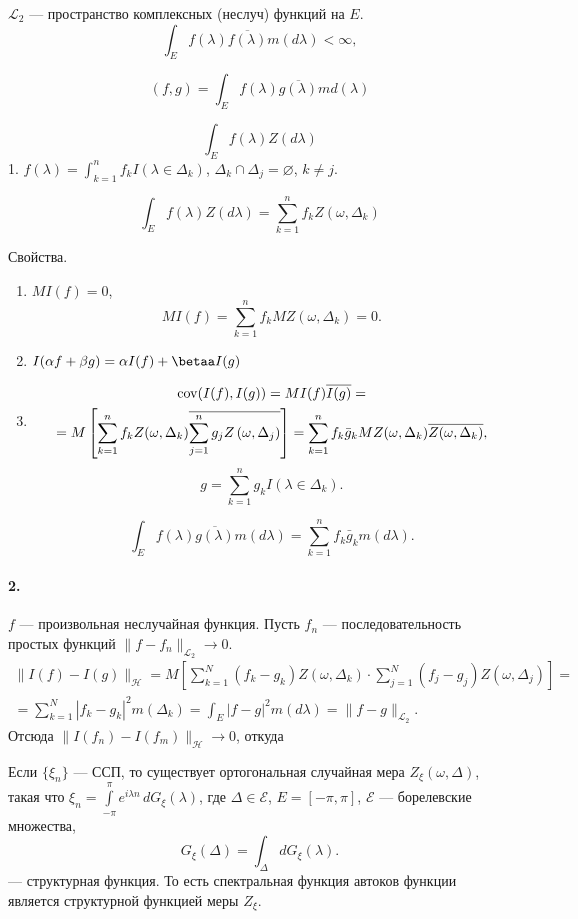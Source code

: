 $\mathscr{L}_2$ --- пространство комплексных (неслуч) функций на $ E $. 
\[
  \int_E f(\lambda)\overline{f(\lambda)} m(d\lambda) < \infty,
\]
 
\[
  (f, g) = \int_E f(\lambda)\overline{g(\lambda)}md(\lambda)
\]
 
\[
    \int_E f(\lambda)Z(d\lambda)
\]
1. $ f(\lambda) = \int_{k=1}^n f_k I(\lambda \in \Delta_k) $,
$ \Delta_k \cap \Delta_j = \varnothing $, $ k\neq j $.
 
\[
  \int_E f(\lambda)Z(d\lambda) = \sum_{k=1}^n f_k Z(\omega,\Delta_k)
\]

Свойства.
\begin{enumerate}
  \item $ MI(f) = 0 $,  
  \[
    MI(f) = \sum_{k=1}^n f_k MZ(\omega, \Delta_k) = 0.
  \]
\item $ I(\alpha f +\beta g) = \alpha I(f) + \betaa I(g) $
\item
  \begin{multline*}
    \operatorname{cov}(I(f), I(g)) = MI(f) \overline{I(g)} = \\ =
    M \left[ \sum_{k=1}^n f_k
      Z(\omega, \Delta_k) \overline{\sum_{j=1}^n g_j Z\left(\omega,\Delta_j\right)}
    \right] = \sum_{k=1}^n f_k \bar{g}_k MZ(\omega, \Delta_k)
    \overline{Z(\omega,\Delta_k)},
  \end{multline*}
\[
  g = \sum_{k=1}^n g_k I(\lambda \in \Delta_k).
\]
 
\[
  \int_E f(\lambda)\overline{g(\lambda)} m(d\lambda) = \sum_{k=1}^n f_k\bar{g}_k
  m(d\lambda).
\]
\end{enumerate}

\paragraph{2.} $ f $ --- произвольная неслучайная функция. Пусть $ f_n $ ---
последовательность простых функций $ \| f - f_n \|_{\mathscr{L}_2} \to 0 $. 
\begin{multline*}
  \|I(f) - I(g)\|_{\mathscr{H}} = M \left[\sum_{k=1}^N(f_k - g_k)Z(\omega,
  \Delta_k)\cdot \sum_{j=1}^N(f_j - g_j)Z(\omega,\Delta_j)\right] = \\ =
  \sum_{k=1}^N
  |f_k - g_k|^2m(\Delta_k) = \int_E |f-g|^2 m(d\lambda) =
  \|f-g\|_{\mathscr{L}_2}.
\end{multline*}
Отсюда $ \|I(f_n) - I(f_m)\|_\mathscr{H} \to 0 $, откуда %

\begin{theorem}
  Если $ \{\xi_n\} $ --- ССП, то существует ортогональная случайная мера $
  Z_\xi(\omega, \Delta) $, такая что $ \xi_n =
  \int\limits_{-\pi}^{\pi}e^{i\lambda n} \,dG_\xi(\lambda) $, где $ \Delta \in
  \mathscr{E} $, $ E = [-\pi, \pi] $, $ \mathscr{E} $ --- борелевские множества,
 \[
     G_\xi(\Delta) = \int_\Delta d G_\xi(\lambda).
 \]
 --- структурная функция. То есть спектральная функция автоков функции является
 структурной функцией меры $ Z_\xi $.
\end{theorem}

